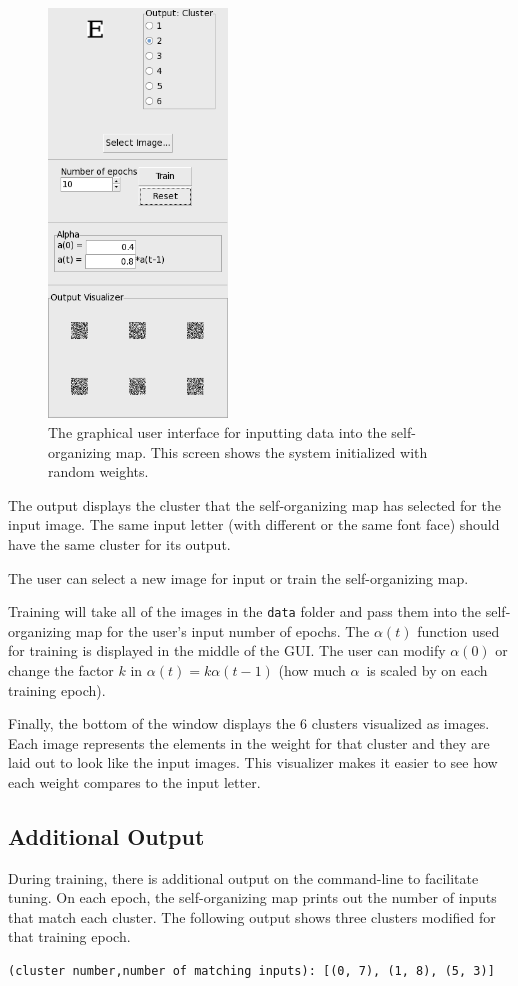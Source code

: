 \documentclass[12pt,letterpaper,oneside]{report}
\newcommand \arfa{$\alpha$}
\newcommand \code[1]{\texttt{#1}}
\begin{document}
\begin{figure}[ht]
  \centering
  \includegraphics[width=180px]{diagrams/gui-plain} 
  \caption{The graphical user interface for inputting data into the self-organizing map. This screen shows the system initialized with random weights.}
  \label{fig:gui-plain}
\end{figure}

The output displays the cluster that the self-organizing map has selected for the input image. The same input letter (with different or the same font face) should have the same cluster for its output.

The user can select a new image for input or train the self-organizing map.

Training will take all of the images in the \code{data} folder and pass them into the self-organizing map for the user's input number of epochs. The $\alpha(t)$ function used for training is displayed in the middle of the GUI. The user can modify $\alpha(0)$ or change the factor $k$ in $\alpha(t) = k\alpha(t-1)$ (how much \arfa~is scaled by on each training epoch). 

Finally, the bottom of the window displays the 6 clusters visualized as images. Each image represents the elements in the weight for that cluster and they are laid out to look like the input images. This visualizer makes it easier to see how each weight compares to the input letter.

\subsection{Additional Output}
During training, there is additional output on the command-line to facilitate tuning. On each epoch, the self-organizing map prints out the number of inputs that match each cluster. The following output shows three clusters modified for that training epoch.
\begin{verbatim}
(cluster number,number of matching inputs): [(0, 7), (1, 8), (5, 3)]
\end{verbatim}
\end{document}
